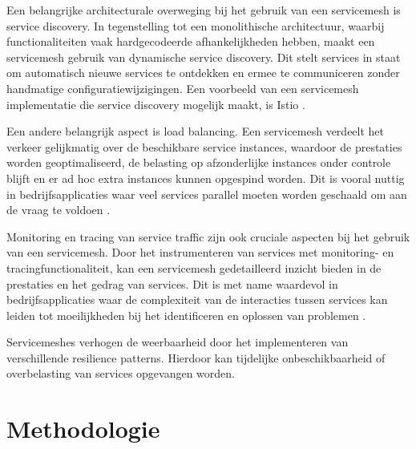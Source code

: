 Een belangrijke architecturale overweging bij het gebruik van een servicemesh is service discovery. In tegenstelling tot een monolithische architectuur, waarbij functionaliteiten vaak hardgecodeerde afhankelijkheden hebben, maakt een servicemesh gebruik van dynamische service discovery. Dit stelt services in staat om automatisch nieuwe services te ontdekken en ermee te communiceren zonder handmatige configuratiewijzigingen. Een voorbeeld van een servicemesh implementatie die service discovery mogelijk maakt, is Istio \autocite{Morgan2021}.

Een andere belangrijk aspect is load balancing. Een servicemesh verdeelt het verkeer gelijkmatig over de beschikbare service instances, waardoor de prestaties worden geoptimaliseerd, de belasting op afzonderlijke instances onder controle blijft en er ad hoc extra instances kunnen opgespind worden. Dit is vooral nuttig in bedrijfsapplicaties waar veel services parallel moeten worden geschaald om aan de vraag te voldoen \autocite{Ciobotaru2020}.

Monitoring en tracing van service traffic zijn ook cruciale aspecten bij het gebruik van een servicemesh. Door het instrumenteren van services met monitoring- en tracingfunctionaliteit, kan een servicemesh gedetailleerd inzicht bieden in de prestaties en het gedrag van services. Dit is met name waardevol in bedrijfsapplicaties waar de complexiteit van de interacties tussen services kan leiden tot moeilijkheden bij het identificeren en oplossen van problemen \autocite{Ciobotaru2021}.

Servicemeshes verhogen de weerbaarheid door het implementeren van verschillende resilience patterns. Hierdoor kan tijdelijke onbeschikbaarheid of overbelasting van services opgevangen worden.



\section{Methodologie}%
\label{sec:methodologie}

